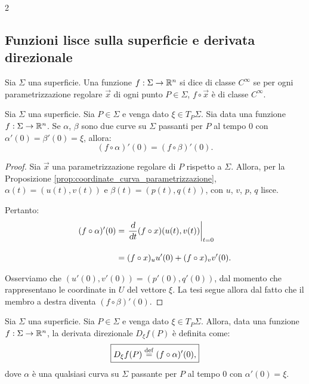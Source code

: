 \begin{multicols*}{2}
    \subsection{Funzioni lisce sulla superficie e derivata direzionale}

    \begin{definition}
        Sia $\Sigma$ una superficie. Una funzione $f : \Sigma \to \mathbb{R}^n$ si
        dice di classe $C^\infty$ se per ogni parametrizzazione regolare
        $\vec{x}$ di ogni punto $P \in \Sigma$, $f \circ \vec{x}$ è di
        classe $C^\infty$.
    \end{definition}

    \begin{proposition}
        Sia $\Sigma$ una superficie. Sia $P \in \Sigma$ e venga dato
        $\xi \in T_P \Sigma$. Sia data una funzione $f : \Sigma \to \mathbb{R}^n$.
        Se $\alpha$, $\beta$ sono due curve su $\Sigma$
        passanti per $P$ al tempo $0$ con $\alpha'(0) = \beta'(0) = \xi$, allora:
        \[
            (f \circ \alpha)'(0) = (f \circ \beta)'(0).
        \]
    \end{proposition}

    \begin{proof}
        Sia $\vec{x}$ una parametrizzazione regolare di $P$ rispetto a $\Sigma$.
        Allora, per la Proposizione \ref{prop:coordinate_curva_parametrizzazione},
        $\alpha(t) = (u(t), v(t))$ e $\beta(t) = (p(t), q(t))$, con $u$, $v$, $p$, $q$ lisce. \smallskip

        Pertanto:
        \[
            \begin{aligned}
                (f \circ \alpha)'(0) & = \dertime{(f \circ x)(u(t), v(t))}{t=0}     \\[1em]
                                     & = (f \circ x)_u u'(0) + (f \circ x)_v v'(0).
            \end{aligned}
        \]

        Osserviamo che $(u'(0), v'(0)) = (p'(0), q'(0))$, dal momento che rappresentano le coordinate
        in $U$ del vettore $\xi$.
        La tesi segue allora dal fatto
        che il membro a destra diventa $(f \circ \beta)'(0)$.
    \end{proof}

    \begin{definition}
        Sia $\Sigma$ una superficie. Sia $P \in \Sigma$ e venga dato
        $\xi \in T_P \Sigma$. Allora, data una funzione $f : \Sigma \to \mathbb{R}^n$,
        la derivata direzionale $D_\xi f(P)$ è definita come:
        \[
            \boxed{D_\xi f(P) \overset{\mathrm{def}}{=} (f \circ \alpha)'(0),}
        \]
        dove $\alpha$ è una qualsiasi curva su $\Sigma$
        passante per $P$ al tempo $0$ con $\alpha'(0) = \xi$.
    \end{definition}


\end{multicols*}
